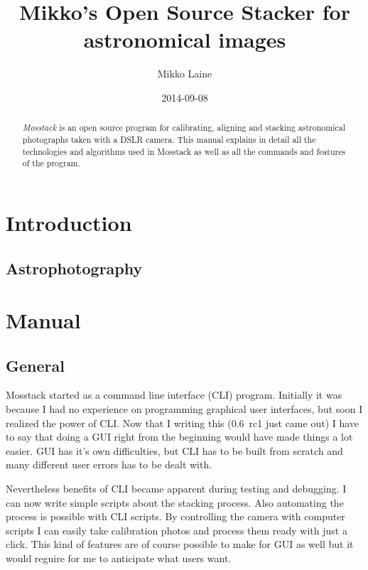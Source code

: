 \documentclass[twoside,a4paper]{refart}
\title{Mikko's Open Source Stacker for astronomical images}
\author{Mikko Laine}
\date{2014-09-08}
\begin{document}
\maketitle

\begin{abstract}
	\textit{Mosstack} is an open source program for calibrating,
	aligning and stacking astronomical photographs taken with a DSLR
	camera. This manual explains in detail all the technologies and
	algorithms used in Mosstack as well as all the commands and
	features of the program.
\end{abstract}



\tableofcontents

\newpage



\section{Introduction}

\subsection{Astrophotography}
\label{astrophotography}

\newpage

\section{Manual}
\label{manual}

\subsection{General}

Mosstack started as a command line interface (CLI) program. Initially it was because I had no experience on programming
graphical user interfaces, but soon I realized the power of CLI. Now that I writing this (0.6~rc1 just came out) I have 
to say that doing a GUI right from the beginning would have made things a lot easier. GUI has it's own difficulties, but
CLI has to be built from scratch and many different user errors has to be dealt with.

Nevertheless benefits of CLI became apparent during testing and debugging. I can now write simple scripts about the
stacking process. Also automating the process is possible with CLI scripts. By controlling the camera with computer
scripts I can easily take calibration photos and process them ready with just a click. This kind of features are of course 
possible to make for GUI as well but it would reguire for me to anticipate what users want.
\end{document}
